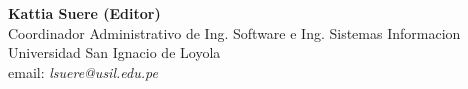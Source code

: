 \begin{center}
\textbf{Kattia Suere­ (Editor)} \\
Coordinador Administrativo de Ing. Software e Ing. Sistemas Informacion \\
Universidad San Ignacio de Loyola \\
email: \textit{lsuere@usil.edu.pe} \\
\end{center}
